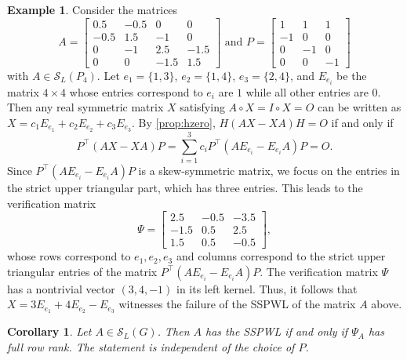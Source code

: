 \documentclass{article}
\newtheorem{corollary}[theorem]{Corollary}
\theoremstyle{definition}
\newtheorem{example}[theorem]{Example}
\newcommand{\trans}{^\top}
\newcommand{\mptn}{\mathcal{S}}
\begin{document}
\begin{example}
\label{ex:p4sspwl}
Consider the matrices 
\[
    A = \begin{bmatrix}
        0.5 & -0.5 & 0 & 0 \\
        -0.5 & 1.5 & -1 & 0 \\
        0 & -1 & 2.5 & -1.5 \\
        0 & 0 & -1.5 & 1.5
    \end{bmatrix}
    \text{ and }
    P = \begin{bmatrix}
        1 & 1 & 1 \\
        -1 & 0 & 0 \\
        0 & -1 & 0 \\
        0 & 0 & -1
    \end{bmatrix}
\]
with $A\in\mptn_L(P_4)$.  Let $e_1 = \{1,3\}$, $e_2 = \{1,4\}$, $e_3 = \{2,4\}$, and $E_{e_i}$ be the matrix $4\times 4$ whose entries correspond to $e_i$ are $1$ while all other entries are $0$.  Then any real symmetric matrix $X$ satisfying $A\circ X = I\circ X = O$ can be written as $X = c_1E_{e_1} + c_2E_{e_2} + c_3E_{e_3}$.  By \cref{prop:hzero}, $H(AX - XA)H = O$ if and only if 
\[
    P\trans(AX - XA)P = \sum_{i=1}^3 c_i P\trans(AE_{e_i} - E_{e_i}A)P = O.
\]
Since $P\trans(AE_{e_i} - E_{e_i}A)P$ is a skew-symmetric matrix, we focus on the entries in the strict upper triangular part, which has three entries.  This leads to the verification matrix
\[
    \Psi = \begin{bmatrix}
        2.5 & -0.5 & -3.5 \\
        -1.5 & 0.5 & 2.5 \\
        1.5 & 0.5 & -0.5
    \end{bmatrix}, 
\]
whose rows correspond to $e_1,e_2,e_3$ and columns correspond to the strict upper triangular entries of the matrix $P\trans(AE_{e_i} - E_{e_i}A)P$.  The verification matrix $\Psi$ has a nontrivial vector $(3,4,-1)$ in its left kernel.  Thus, it follows that $X = 3E_{e_1} + 4E_{e_2} - E_{e_3}$ witnesses the failure of the SSPWL of the matrix $A$ above.
\end{example} 

\begin{corollary}
Let $A\in\mptn_L(G)$.  Then $A$ has the SSPWL if and only if $\Psi_A$ has full row rank.  The statement is independent of the choice of $P$.
\end{corollary}
\end{document}
